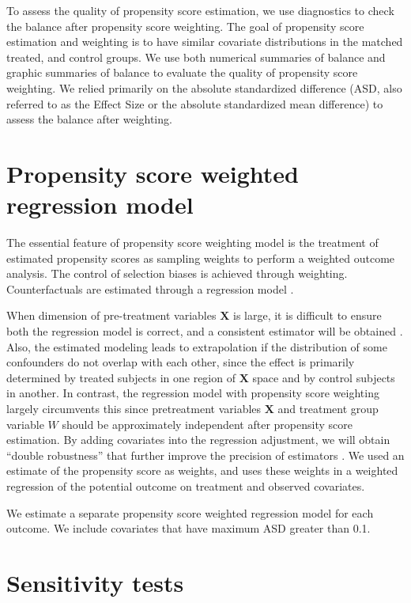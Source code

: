 To assess the quality of propensity score estimation, we use diagnostics to check the balance after propensity score weighting. The goal of propensity score estimation and weighting is to have similar covariate distributions in the matched treated, and control groups. We use both numerical summaries of balance and graphic summaries of balance to evaluate the quality of propensity score weighting. We relied primarily on the absolute standardized difference (ASD, also referred to as the Effect Size or the absolute standardized mean difference) to assess the balance after weighting. 

\section{Propensity score weighted regression model}
The essential feature of propensity score weighting model is the treatment of estimated propensity scores as sampling weights to perform a weighted outcome analysis. The control of selection biases is achieved through weighting. Counterfactuals are estimated through a regression model \citep{guo2009propensity}.

When dimension of pre-treatment variables $\textbf{X}$ is large, it is difficult to ensure both the regression model is correct, and a consistent estimator will be obtained \citep{rubin1997estimating}. Also, the estimated modeling leads to extrapolation if the distribution of some confounders do not overlap with each other, since the effect is primarily determined by treated subjects in one region of $\textbf{X}$ space and by control subjects in another. In contrast, the regression model with propensity score weighting largely circumvents this since pretreatment variables $\textbf{X}$ and treatment group variable $W$ should be approximately independent after propensity score estimation. By adding covariates into the regression adjustment, we will obtain ``double robustness'' that further improve the precision of estimators \citep{lunceford2004stratification}. We used an estimate of the propensity score as weights, and uses these weights in a weighted regression of the potential outcome on treatment and observed covariates.

We estimate a separate propensity score weighted regression model for each outcome. We include covariates that have maximum ASD greater than 0.1. 

\section{Sensitivity tests}

